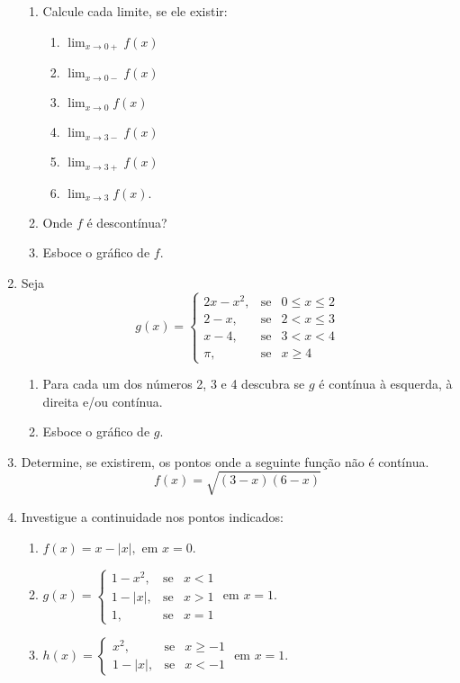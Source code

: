 \begin{enumerate}
\begin{enumerate} \item Calcule cada limite, se ele existir:
\begin{multicols}{3}
\begin{enumerate}
\item $\displaystyle\lim_{x\longrightarrow0+} f(x)$ \item
$\displaystyle\lim_{x\longrightarrow0-} f(x) $ \item $
\displaystyle\lim_{x\longrightarrow0} f(x)$ \item
$\displaystyle\lim_{x\longrightarrow3-} f(x)$ \item
$\displaystyle\lim_{x\longrightarrow3+} f(x) $ \item $
\displaystyle\lim_{x\longrightarrow3} f(x).$
\end{enumerate}
\end{multicols}
\item Onde $f$ é descontínua?
\item Esboce o gráfico de $f$.
\end{enumerate}

\item Seja $$g(x) =
\left\{\begin{array}{rcl}2x-x^2,& \mbox{se}&0\leq x\leq 2\\
 2-x,& \mbox{se}&2<x \leq 3\\
  x-4,& \mbox{se}& 3<x<4\\
\pi,& \mbox{se}& x \geq 4
  \end{array} \right.$$

\begin{enumerate} \item Para cada um dos números 2, 3 e 4 descubra se $g$ é contínua à esquerda, à direita e/ou contínua.
\item Esboce o gráfico de $g$.
\end{enumerate}
\item Determine, se existirem, os pontos onde a seguinte função não é contínua.
$$f(x)=\displaystyle\sqrt{(3-x)(6-x)}$$

\item Investigue a continuidade nos pontos indicados:
\begin{enumerate}
\item $f(x)=x-|x|,$ em $x=0.$
 \item $ g(x) = \left\{\begin{array}{rcl}
 1 - x^2,& \mbox{se}& x < 1\\
  1-|x|,& \mbox{se}& x> 1\\
  1,& \mbox{se}& x = 1 \end{array}
\right.$ em $x = 1.$
 \item $h(x) = \left\{\begin{array}{rcl} x^2,& \mbox{se}&x \geq -1\\
  1 -|x|,& \mbox{se}& x < -1\end{array} \right.$ em $x = 1.$
\end{enumerate}


\end{enumerate}
